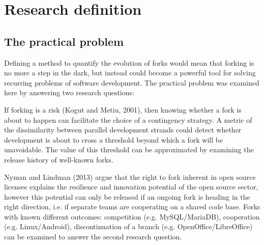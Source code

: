 
\chapter{Research definition} %

\label{Chapter2} %

\section{The practical problem}

Defining a method to quantify the evolution of forks would mean that forking is no more a step in the dark, but instead could become a powerful tool for solving recurring problems of software development. The practical problem was examined here by answering two research questions:


\noindent
If forking is a risk (Kogut and Metiu, 2001), then knowing whether a fork is about to happen can facilitate the choice of a contingency strategy. A metric of the dissimilarity between parallel development strands could detect whether development is about to cross a threshold beyond which a fork will be unavoidable. The value of this threshold can be approximated by examining the release history of well-known forks.


\noindent
Nyman and Lindman (2013) argue that the right to fork inherent in open source licenses explains the resilience and innovation potential of the open source sector, however this potential can only be released if an ongoing fork is heading in the right direction, i.e. if separate teams are cooperating on a shared code base. Forks with known different outcomes: competition (e.g. MySQL/MariaDB), cooperation (e.g. Linux/Android), discontinuation of a branch (e.g. OpenOffice/LibreOffice) can be examined to answer the second research question.


